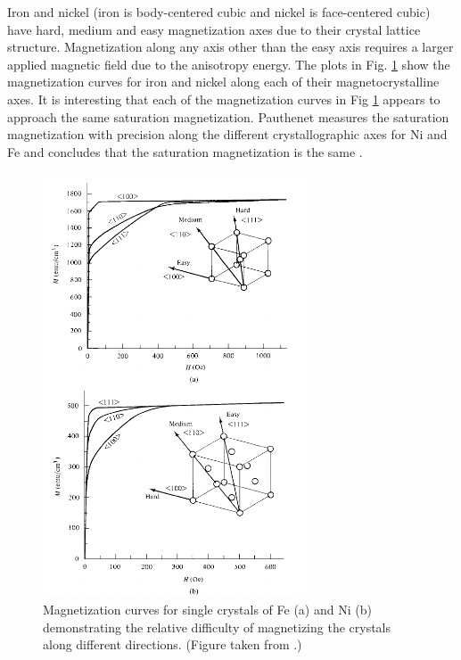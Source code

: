 \documentclass[12pt]{article}
\begin{document}
Iron and nickel (iron is body-centered cubic and nickel is face-centered cubic) have hard, medium and easy magnetization axes due to their crystal lattice structure. Magnetization along any axis other than the easy axis requires a larger applied magnetic field due to the anisotropy energy. The plots in Fig. \ref{fig:anisotropy_Ni_Fe} show the magnetization curves for iron and nickel along each of their magnetocrystalline axes. It is interesting that each of the magnetization curves in Fig \ref{fig:anisotropy_Ni_Fe} appears to approach the same saturation magnetization. Pauthenet measures the saturation magnetization with precision along the different crystallographic axes for Ni and Fe and concludes that the saturation magnetization is the same \cite{PauthenetNov1982}. 
\begin{figure}[ht]
\centering
\includegraphics[width=0.7\textwidth]{anisotropy_Ni_Fe.png}
\caption{Magnetization curves for single crystals of Fe (a) and Ni (b) demonstrating the relative difficulty of magnetizing the crystals along different directions. (Figure taken from \cite{Cullity2008}.)}
\label{fig:anisotropy_Ni_Fe}
\end{figure}
\end{document}
